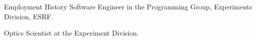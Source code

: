 \begin{rubric}{Employment History}
\entry*[1993 –- 1999] 	Software Engineer in the Programming Group, Experiments Division, ESRF.


\entry*[1990 –- 1992]	Optics Scientist at the Experiment Division.


\end{rubric}